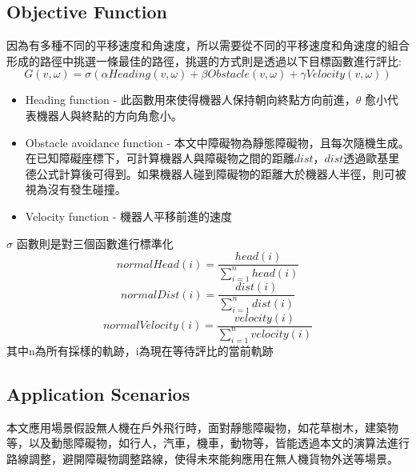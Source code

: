 \documentclass[crop=false]{standalone}
\begin{document}
	\subsection{Objective Function}
	因為有多種不同的平移速度和角速度，所以需要從不同的平移速度和角速度的組合形成的路徑中挑選一條最佳的路徑，挑選的方式則是透過以下目標函數進行評比:
	\begin{equation}
		G(v, \omega)=\sigma(\alpha Heading(v, \omega) + \beta Obstacle(v, \omega) + \gamma Velocity(v, \omega))
	\end{equation}
	\begin{itemize}
		\item Heading function - 此函數用來使得機器人保持朝向終點方向前進，$\theta$ 愈小代表機器人與終點的方向角愈小。
		\item Obstacle avoidance function - 本文中障礙物為靜態障礙物，且每次隨機生成。在已知障礙座標下，可計算機器人與障礙物之間的距離$dist$，$dist$透過歐基里德公式計算後可得到。如果機器人碰到障礙物的距離大於機器人半徑，則可被視為沒有發生碰撞。
		\item Velocity function - 機器人平移前進的速度
	\end{itemize}
	$\sigma$ 函數則是對三個函數進行標準化
	\begin{equation}
		normalHead(i)=\frac{head(i)}{\sum_{i=1}^{n}{head(i)}}
	\end{equation}
	\begin{equation}
		normalDist(i)=\frac{dist(i)}{\sum_{i=1}^{n}{dist(i)}}
	\end{equation}
	\begin{equation}
		normalVelocity(i)=\frac{velocity(i)}{\sum_{i=1}^{n}{velocity(i)}}
	\end{equation}
	其中n為所有採樣的軌跡，i為現在等待評比的當前軌跡
	
	\subsection{Application Scenarios}
	本文應用場景假設無人機在戶外飛行時，面對靜態障礙物，如花草樹木，建築物等，以及動態障礙物，如行人，汽車，機車，動物等，皆能透過本文的演算法進行路線調整，避開障礙物調整路線，使得未來能夠應用在無人機貨物外送等場景。
\end{document}
